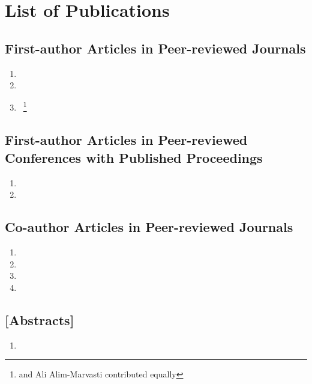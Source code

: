 \chapter{List of Publications}

\section*{First-author Articles in Peer-reviewed Journals} %
\label{sec:first_author_journal_articles}
\begin{enumerate}
  \item {}
  \item {}
  \item {}~\footnote{\theauthor and Ali Alim-Marvasti contributed equally}
\end{enumerate}

\section*{First-author Articles in Peer-reviewed Conferences with Published Proceedings}
\label{sec:first_author_peer_reviewed_conference_papers}
\begin{enumerate}
  \item {\sloppy {}}
  \item {}
\end{enumerate}

\section*{Co-author Articles in Peer-reviewed Journals} %
\label{sec:journal_articles}
\begin{enumerate}
  \item {}
  \item {}
  \item {}
  \item {}
\end{enumerate}

\section*{[Abstracts]} %
\label{sec:abstracts}
\begin{enumerate}
  \item
\end{enumerate}
